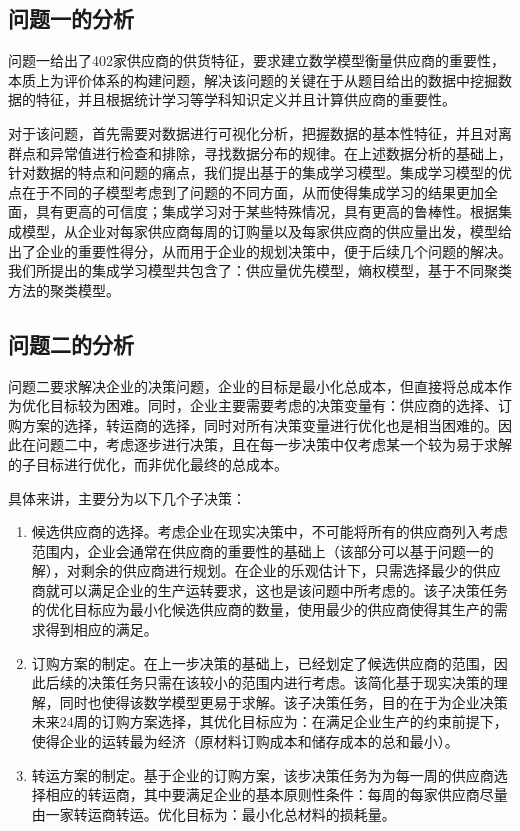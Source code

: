 \documentclass{my_paper}
\begin{document}
\subsection{问题一的分析}
问题一给出了402家供应商的供货特征，要求建立数学模型衡量供应商的重要性，本质上为评价体系的构建问题，解决该问题的关键在于从题目给出的数据中挖掘数据的特征，并且根据统计学习等学科知识定义并且计算供应商的重要性。

对于该问题，首先需要对数据进行可视化分析，把握数据的基本性特征，并且对离群点和异常值进行检查和排除，寻找数据分布的规律。在上述数据分析的基础上，针对数据的特点和问题的痛点，我们提出基于的集成学习模型。集成学习模型的优点在于不同的子模型考虑到了问题的不同方面，从而使得集成学习的结果更加全面，具有更高的可信度；集成学习对于某些特殊情况，具有更高的鲁棒性。根据集成模型，从企业对每家供应商每周的订购量以及每家供应商的供应量出发，模型给出了企业的重要性得分，从而用于企业的规划决策中，便于后续几个问题的解决。我们所提出的集成学习模型共包含了：供应量优先模型，熵权模型，基于不同聚类方法的聚类模型。

\subsection{问题二的分析}
问题二要求解决企业的决策问题，企业的目标是最小化总成本，但直接将总成本作为优化目标较为困难。同时，企业主要需要考虑的决策变量有：供应商的选择、订购方案的选择，转运商的选择，同时对所有决策变量进行优化也是相当困难的。因此在问题二中，考虑逐步进行决策，且在每一步决策中仅考虑某一个较为易于求解的子目标进行优化，而非优化最终的总成本。

具体来讲，主要分为以下几个子决策：

\begin{enumerate}

\item 候选供应商的选择。考虑企业在现实决策中，不可能将所有的供应商列入考虑范围内，企业会通常在供应商的重要性的基础上（该部分可以基于问题一的解），对剩余的供应商进行规划。在企业的乐观估计下，只需选择最少的供应商就可以满足企业的生产运转要求，这也是该问题中所考虑的。该子决策任务的优化目标应为最小化候选供应商的数量，使用最少的供应商使得其生产的需求得到相应的满足。

\item 订购方案的制定。在上一步决策的基础上，已经划定了候选供应商的范围，因此后续的决策任务只需在该较小的范围内进行考虑。该简化基于现实决策的理解，同时也使得该数学模型更易于求解。该子决策任务，目的在于为企业决策未来24周的订购方案选择，其优化目标应为：在满足企业生产的约束前提下，使得企业的运转最为经济（原材料订购成本和储存成本的总和最小）。

\item 转运方案的制定。基于企业的订购方案，该步决策任务为为每一周的供应商选择相应的转运商，其中要满足企业的基本原则性条件：每周的每家供应商尽量由一家转运商转运。优化目标为：最小化总材料的损耗量。

\end{enumerate}
\end{document}

